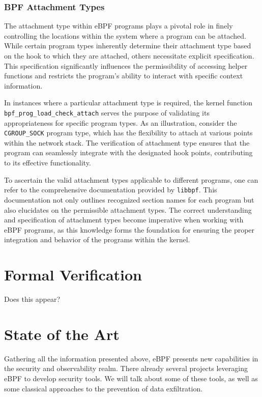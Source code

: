 \subsubsection{BPF Attachment Types}


The attachment type within eBPF programs plays a pivotal role in finely controlling the locations within the system where a program can be attached. While certain program types inherently determine their attachment type based on the hook to which they are attached, others necessitate explicit specification. This specification significantly influences the permissibility of accessing helper functions and restricts the program's ability to interact with specific context information.

In instances where a particular attachment type is required, the kernel function \texttt{bpf\_prog\_load\_check\_attach} serves the purpose of validating its appropriateness for specific program types. As an illustration, consider the \texttt{CGROUP\_SOCK} program type, which has the flexibility to attach at various points within the network stack. The verification of attachment type ensures that the program can seamlessly integrate with the designated hook points, contributing to its effective functionality.

To ascertain the valid attachment types applicable to different programs, one can refer to the comprehensive documentation provided by \texttt{libbpf}. This documentation not only outlines recognized section names for each program but also elucidates on the permissible attachment types. The correct understanding and specification of attachment types become imperative when working with eBPF programs, as this knowledge forms the foundation for ensuring the proper integration and behavior of the programs within the kernel.

\section{Formal Verification}

Does this appear?


\section{State of the Art}

Gathering all the information presented above, eBPF presents new capabilities in  the security and observability realm. There already several projects leveraging eBPF to develop security tools.
We will talk about some of these tools, as well as some classical approaches to the prevention of data exfiltration. 


